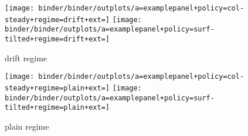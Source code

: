 
\begin{figure*}
  \centering

\begin{subfigure}[b]{\textwidth}
\centering
\texttt{[image: binder/binder/outplots/a=examplepanel+policy=col-steady+regime=drift+ext=]}%
\texttt{[image: binder/binder/outplots/a=examplepanel+policy=surf-tilted+regime=drift+ext=]}
\caption{drift regime}
\label{fig:examplepanel-drift}
\end{subfigure}

\begin{subfigure}[b]{\textwidth}
\centering
\texttt{[image: binder/binder/outplots/a=examplepanel+policy=col-steady+regime=plain+ext=]}%
\texttt{[image: binder/binder/outplots/a=examplepanel+policy=surf-tilted+regime=plain+ext=]}
\caption{plain regime}
\label{fig:examplepanel-plain}
\end{subfigure}

  \caption{Comparison of reconstruction to reference tree for steady and tilted policies under drift (\ref{fig:examplepanel-drift}) and plain (\ref{fig:examplepanel-plain}) evolutionary regimes. Phylogeny time axes are log scale. Note that overlay layout is naive, so can underrepresent agreement between trees; however, comparison is informative to general differences in tree structure.}
  \label{fig:examplepanel}

\end{figure*}
